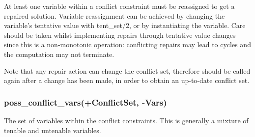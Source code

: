 At least one variable within a conflict constraint must be reassigned
to get a repaired solution.
Variable reassignment can be achieved
by changing the variable's tentative value with tent_set/2,
or by instantiating the variable.
Care should be taken whilst implementing repairs through tentative
value changes since this is a non-monotonic operation: conflicting repairs
may lead to cycles and the computation may not terminate.  

Note that any repair action can change the conflict set,
therefore  should be called again after
a change has been made, in order to obtain an up-to-date conflict set.


\subsubsection{poss_conflict_vars(+ConflictSet, -Vars)}
The set of variables within the conflict constraints.
This is generally a mixture of tenable and untenable variables.



%
%
%


